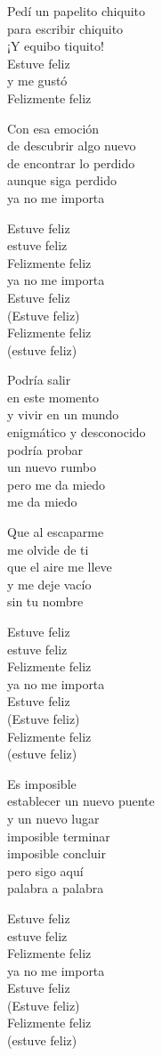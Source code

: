 \begin{lyrics}
Pedí un papelito chiquito\\
para escribir chiquito\\
¡Y equibo tiquito!\\
Estuve feliz\\
y me gustó\\
Felizmente feliz

Con esa emoción\\
de descubrir algo nuevo\\
de encontrar lo perdido\\
aunque siga perdido\\
ya no me importa

Estuve feliz\\
estuve feliz\\
Felizmente feliz\\
ya no me importa\\
Estuve feliz\\
(Estuve feliz)\\
Felizmente feliz\\
(estuve feliz)

Podría salir\\
en este momento\\
y vivir en un mundo\\
enigmático y desconocido\\
podría probar\\
un nuevo rumbo\\
pero me da miedo\\
me da miedo

Que al escaparme\\
me olvide de ti\\
que el aire me lleve\\
y me deje vacío\\
sin tu nombre

Estuve feliz\\
estuve feliz\\
Felizmente feliz\\
ya no me importa\\
Estuve feliz\\
(Estuve feliz)\\
Felizmente feliz\\
(estuve feliz)

Es imposible\\
establecer un nuevo puente\\
y un nuevo lugar\\
imposible terminar\\
imposible concluir\\
pero sigo aquí\\
palabra a palabra

Estuve feliz\\
estuve feliz\\
Felizmente feliz\\
ya no me importa\\
Estuve feliz\\
(Estuve feliz)\\
Felizmente feliz\\
(estuve feliz)
\end{lyrics}

